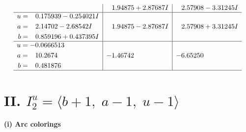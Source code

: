 \documentclass[1p]{elsarticle_modified}
\theoremstyle{definition}
\begin{document}
$$\begin{array}{c|c|c}
 & \phantom{-}1.94875 + 2.87687 I & \phantom{-}2.57908 - 3.31245 I \\ \hline\begin{aligned}
u &= \phantom{-}0.175939 - 0.254021 I \\
a &= \phantom{-}2.14702 - 2.68542 I \\
b &= \phantom{-}0.859196 + 0.437395 I\end{aligned}
 & \phantom{-}1.94875 - 2.87687 I & \phantom{-}2.57908 + 3.31245 I \\ \hline\begin{aligned}
u &= -0.0666513\phantom{ +0.000000I} \\
a &= \phantom{-}10.2674\phantom{ +0.000000I} \\
b &= \phantom{-}0.481876\phantom{ +0.000000I}\end{aligned}
 & -1.46742\phantom{ +0.000000I} & -6.65250\phantom{ +0.000000I}\\
 \hline 
 \end{array}$$\newpage\newpage\renewcommand{\arraystretch}{1}
\centering \section*{II. $I^u_{2}= \langle b+1,\;a-1,\;u-1 \rangle$}
\flushleft \textbf{(i) Arc colorings}\\
\end{document}
